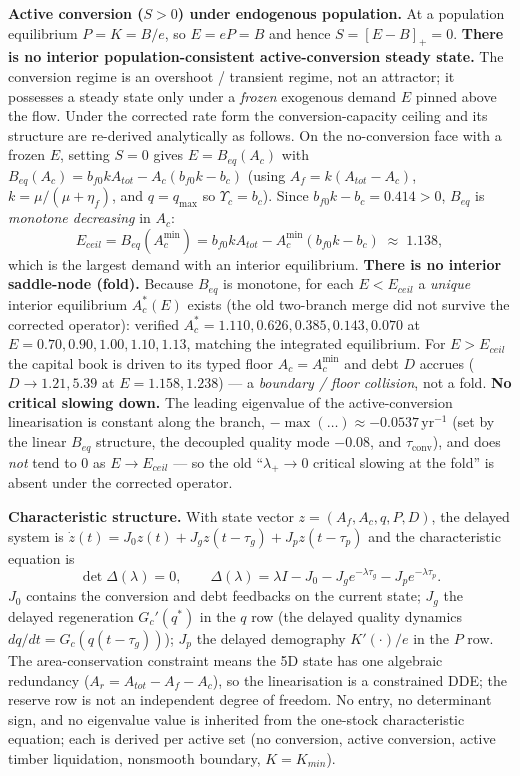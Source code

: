 \documentclass[11pt]{article}
\begin{document}
\noindent\textbf{Active conversion ($S>0$) under endogenous population.} At a population equilibrium $P=K=B/e$, so $E=eP=B$ and hence $S=[E-B]_+=0$. \textbf{There is no interior population-consistent active-conversion steady state.} The conversion regime is an overshoot / transient regime, not an attractor; it possesses a steady state only under a \emph{frozen} exogenous demand $E$ pinned above the flow. Under the corrected rate form the conversion-capacity ceiling and its structure are re-derived analytically as follows. On the no-conversion face with a frozen $E$, setting $S=0$ gives $E=B_{eq}(A_c)$ with $B_{eq}(A_c)=b_{f0}kA_{tot}-A_c(b_{f0}k-b_c)$ (using $A_f=k(A_{tot}-A_c)$, $k=\mu/(\mu+\eta_f)$, and $q=q_{\max}$ so $\Upsilon_c=b_c$). Since $b_{f0}k-b_c=0.414>0$, $B_{eq}$ is \emph{monotone decreasing} in $A_c$:
\[
E_{ceil}=B_{eq}(A_c^{\min})=b_{f0}kA_{tot}-A_c^{\min}(b_{f0}k-b_c)\;\approx\;1.138,
\]
which is the largest demand with an interior equilibrium. \textbf{There is no interior saddle-node (fold).} Because $B_{eq}$ is monotone, for each $E<E_{ceil}$ a \emph{unique} interior equilibrium $A_c^*(E)$ exists (the old two-branch merge did not survive the corrected operator): verified $A_c^*=1.110,0.626,0.385,0.143,0.070$ at $E=0.70,0.90,1.00,1.10,1.13$, matching the integrated equilibrium. For $E>E_{ceil}$ the capital book is driven to its typed floor $A_c=A_c^{\min}$ and debt $D$ accrues ($D\to1.21,5.39$ at $E=1.158,1.238$) --- a \emph{boundary / floor collision}, not a fold. \textbf{No critical slowing down.} The leading eigenvalue of the active-conversion linearisation is constant along the branch, $-\max(\ldots)\approx-0.0537\,\text{yr}^{-1}$ (set by the linear $B_{eq}$ structure, the decoupled quality mode $-0.08$, and $\tau_{\mathrm{conv}}$), and does \emph{not} tend to $0$ as $E\to E_{ceil}$ --- so the old ``$\lambda_+\to0$ critical slowing at the fold'' is absent under the corrected operator.

\noindent\textbf{Characteristic structure.} With state vector $z=(A_f,A_c,q,P,D)$, the delayed system is $\dot z(t)=J_0z(t)+J_gz(t-\tau_g)+J_pz(t-\tau_p)$ and the characteristic equation is
\[
\det\Delta(\lambda)=0,\qquad \Delta(\lambda)=\lambda I-J_0-J_ge^{-\lambda\tau_g}-J_pe^{-\lambda\tau_p}.
\]
$J_0$ contains the conversion and debt feedbacks on the current state; $J_g$ the delayed regeneration $G_c'(q^*)$ in the $q$ row (the delayed quality dynamics $dq/dt=G_c(q(t-\tau_g))$); $J_p$ the delayed demography $K'(\cdot)/e$ in the $P$ row. The area-conservation constraint means the 5D state has one algebraic redundancy ($A_r=A_{tot}-A_f-A_c$), so the linearisation is a constrained DDE; the reserve row is not an independent degree of freedom. No entry, no determinant sign, and no eigenvalue value is inherited from the one-stock characteristic equation; each is derived per active set (no conversion, active conversion, active timber liquidation, nonsmooth boundary, $K=K_{min}$).
\end{document}
